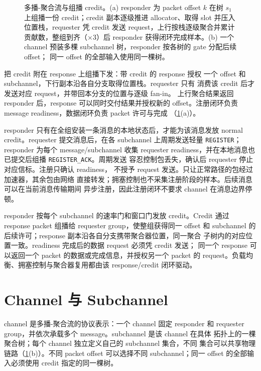 \begin{figure}[t]
\centering

\caption{多播-聚合流与组播 credit。(a) responder 为 packet offset $k$
在树 $s_1$ 上组播一份 credit；credit 副本逐级推进 allocator、取得 slot
并压入位置栈，requester 凭 credit 发送 request，上行按栈逐级聚合并累计
贡献数，整组到齐（$\times3$）后 responder 获得闭环完成样本。(b) 一个
channel 预装多棵 subchannel 树，responder 按各树的 gate 分配后续 offset；
同一 offset 的全部输入使用同一棵树。}
\label{fig:design-overview}
\end{figure}

\sysname 把 credit 附在 response 上组播下发：带 credit 的 response 授权
一个 offset 和 subchannel，下行副本沿各自分支取得位置栈。requester 只有
消费该 credit 后才发送对应 request，并带回本分支的位置与逐级 fan-in。
上行聚合结果返回 responder 后，response 可以同时交付结果并授权新的
offset。注册闭环负责 message readiness，数据闭环负责 packet 许可与完成
（\cref{fig:design-overview}(a)）。

responder 只有在全组安装一条消息的本地状态后，才能为该消息发放 normal
credit。requester 提交消息后，在各 subchannel 上周期发送轻量
\texttt{REGISTER}；responder 为每个 message/subchannel 收集 requester
readiness，并在本地消息也已提交后组播 \texttt{REGISTER\_ACK}。周期发送
容忍控制包丢失，确认后 requester 停止对应信标。注册只确认 readiness，
不授予 request 发送。\sysname 只让正常路径的包经过加速器，其余包由网络
直接转发；拥塞控制也不采集注册阶段的样本。后续消息可以在当前消息传输期间
异步注册，因此注册闭环不要求 channel 在消息边界停顿。

responder 按每个 subchannel 的速率门和窗口门发放 credit。Credit 通过
response packet 组播给 requester group，使整组获得同一 offset 和
subchannel 的后续许可；response 副本沿各自分支携带聚合器位置，同一聚合
子树内的对应位置一致。readiness 完成后的数据 request 必须凭 credit 发送；
同一个 response 可以返回一个 packet 的数据或完成信息，并授权另一个
packet 的 request。负载均衡、拥塞控制与聚合器复用都由该 response/credit
闭环驱动。

\section{Channel 与 Subchannel}
\label{ssec:channel-subchannel}

channel 是多播-聚合流的协议表示：一个 channel 固定 responder 和
requester group，并依次承载多个 message。subchannel 是该 channel 在具体
拓扑上的一棵聚合树；每个 channel 独立定义自己的 subchannel 集合，不同
集合可以共享物理链路（\cref{fig:design-overview}(b)）。不同 packet
offset 可以选择不同 subchannel；同一 offset 的全部输入必须使用 credit
指定的同一棵树。

